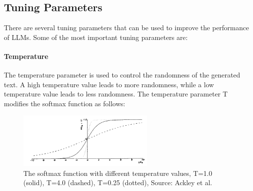 

\subsection{Tuning Parameters}

There are several tuning parameters that can be used to improve the performance of LLMs. Some of the most important tuning parameters are:

\paragraph{Temperature}
The temperature parameter is used to control the randomness of the generated text. A high temperature value leads to more randomness, while a low temperature value leads to less randomness. The temperature parameter T modifies the softmax function as follows:

\begin{figure}[h!]
    \centering
    \includegraphics[width=0.6\textwidth]{images/temperature.png}
    \caption{The softmax function with different temperature values, T=1.0 (solid), T=4.0 (dashed), T=0.25 (dotted), Source: Ackley et al.\cite{ACKLEY.1985}}
    \label{fig:temperature}
\end{figure}

